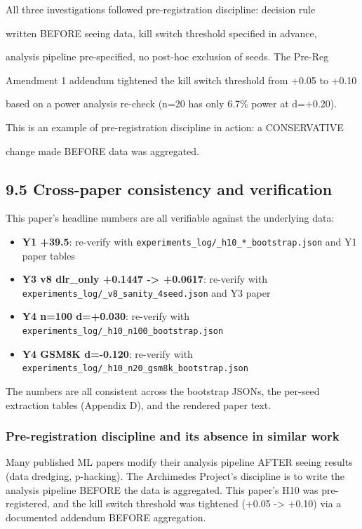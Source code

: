 \documentclass[11pt]{article}
\begin{document}
All three investigations followed pre-registration discipline: decision
rule

written BEFORE seeing data, kill switch threshold specified in advance,

analysis pipeline pre-specified, no post-hoc exclusion of seeds. The
Pre-Reg

Amendment 1 addendum tightened the kill switch threshold from +0.05 to
+0.10

based on a power analysis re-check (n=20 has only 6.7\% power at
d=+0.20).

This is an example of pre-registration discipline in action: a
CONSERVATIVE

change made BEFORE data was aggregated.

\subsection{9.5 Cross-paper consistency and
verification}\label{cross-paper-consistency-and-verification}

This paper's headline numbers are all verifiable against the underlying
data:

\begin{itemize}

\item
  \textbf{Y1 +39.5}: re-verify with
  \texttt{experiments\_log/\_h10\_*\_bootstrap.json} and Y1 paper tables
\item
  \textbf{Y3 v8 dlr\_only +0.1447 -\textgreater{} +0.0617}: re-verify
  with \texttt{experiments\_log/\_v8\_sanity\_4seed.json} and Y3 paper
\item
  \textbf{Y4 n=100 d=+0.030}: re-verify with
  \texttt{experiments\_log/\_h10\_n100\_bootstrap.json}
\item
  \textbf{Y4 GSM8K d=-0.120}: re-verify with
  \texttt{experiments\_log/\_h10\_n20\_gsm8k\_bootstrap.json}
\end{itemize}

The numbers are all consistent across the bootstrap JSONs, the per-seed
extraction tables (Appendix D), and the rendered paper text.

\subsubsection{Pre-registration discipline and its absence in similar
work}\label{pre-registration-discipline-and-its-absence-in-similar-work}

Many published ML papers modify their analysis pipeline AFTER seeing
results (data dredging, p-hacking). The Archimedes Project's discipline
is to write the analysis pipeline BEFORE the data is aggregated. This
paper's H10 was pre-registered, and the kill switch threshold was
tightened (+0.05 -\textgreater{} +0.10) via a documented addendum BEFORE
aggregation.
\end{document}
